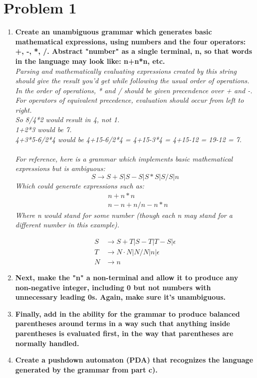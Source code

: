 \section*{Problem 1}
\begin{enumerate}[label=\alph*.]
  \item \textbf{Create an unambiguous grammar which generates basic
  mathematical expressions, using numbers and the four operators: +, -, *, /.
  Abstract "number" as a single terminal, n, so that words in the language may
  look like: n+n*n, etc.}
  \\
\emph{Parsing and mathematically evaluating expressions created by this string
  should give the result you'd get while following the usual order of
  operations. In the order of operations, * and / should be given precendence
  over + and -. For operators of equivalent precedence, evaluation should occur
  from left to right.\\
So 8/4*2 would result in 4, not 1.\\
1+2*3 would be 7.\\
4+3*5-6/2*4 would be 4+15-6/2*4 = 4+15-3*4 =  4+15-12 = 19-12 = 7.\\
\\
For reference, here is a grammar which implements basic mathematical
expressions but is ambiguous:\\
\[ S \rightarrow S+S | S-S | S*S | S/S | n \]
Which could generate expressions such as:\\
\begin{align*}
&n+n*n\\
&n-n+n/n-n*n
\end{align*}
Where n would stand for some number (though each n may stand for a different
number in this example).}

\par

\begin{align*}
  S &\rightarrow S + T | S - T | T - S | \epsilon \\
  T &\rightarrow N \cdot N | N / N | n | \epsilon\\
  N &\rightarrow n
\end{align*}
\item \textbf{Next, make the "n" a non-terminal and allow it to produce any
  non-negative integer, including 0 but not numbers with unnecessary leading
0s. Again, make sure it's unambiguous.}
  \item \textbf{Finally, add in the ability for the grammar to
    produce balanced parentheses around terms in a way such that
    anything inside parentheses is evaluated first, in the way that
    parentheses are normally handled.}
  \item \textbf{Create a pushdown automaton (PDA) that recognizes the language
  generated by the grammar from part c).}

\end{enumerate}

